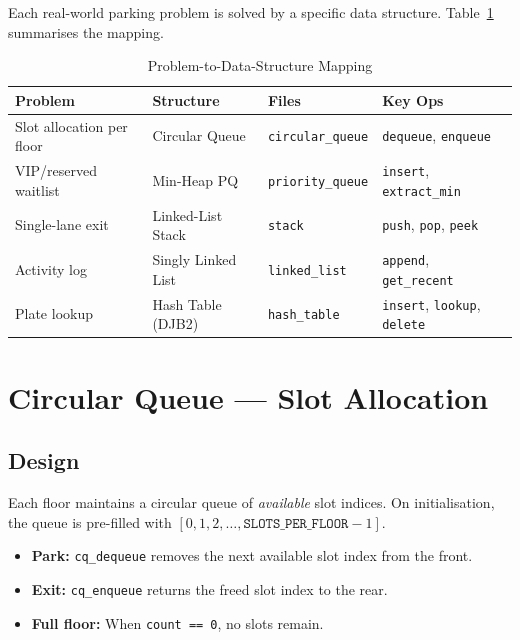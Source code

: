 \documentclass[12pt, a4paper]{report}
\begin{document}
Each real-world parking problem is solved by a specific data structure.
Table~\ref{tab:ds-mapping} summarises the mapping.

\begin{table}[H]
\centering
\caption{Problem-to-Data-Structure Mapping}
\label{tab:ds-mapping}
{\small
\begin{tabularx}{\textwidth}{@{}p{3cm}p{3cm}lX@{}}
\toprule
\textbf{Problem} & \textbf{Structure} & \textbf{Files} & \textbf{Key Ops} \\
\midrule
Slot allocation per floor & Circular Queue &
  \texttt{circular\_queue} &
  \texttt{dequeue}, \texttt{enqueue} \\[4pt]
VIP/reserved waitlist & Min-Heap PQ &
  \texttt{priority\_queue} &
  \texttt{insert}, \texttt{extract\_min} \\[4pt]
Single-lane exit & Linked-List Stack &
  \texttt{stack} &
  \texttt{push}, \texttt{pop}, \texttt{peek} \\[4pt]
Activity log & Singly Linked List &
  \texttt{linked\_list} &
  \texttt{append}, \texttt{get\_recent} \\[4pt]
Plate lookup & Hash Table (DJB2) &
  \texttt{hash\_table} &
  \texttt{insert}, \texttt{lookup}, \texttt{delete} \\
\bottomrule
\end{tabularx}
}
\end{table}

\section{Circular Queue --- Slot Allocation}

\subsection{Design}

Each floor maintains a circular queue of \emph{available} slot indices.
On initialisation, the queue is pre-filled with
$[0, 1, 2, \ldots, \texttt{SLOTS\_PER\_FLOOR}-1]$.

\begin{itemize}[nosep]
  \item \textbf{Park:} \texttt{cq\_dequeue} removes the next available
        slot index from the front.
  \item \textbf{Exit:} \texttt{cq\_enqueue} returns the freed slot index
        to the rear.
  \item \textbf{Full floor:} When \texttt{count == 0}, no slots remain.
\end{itemize}
\end{document}
